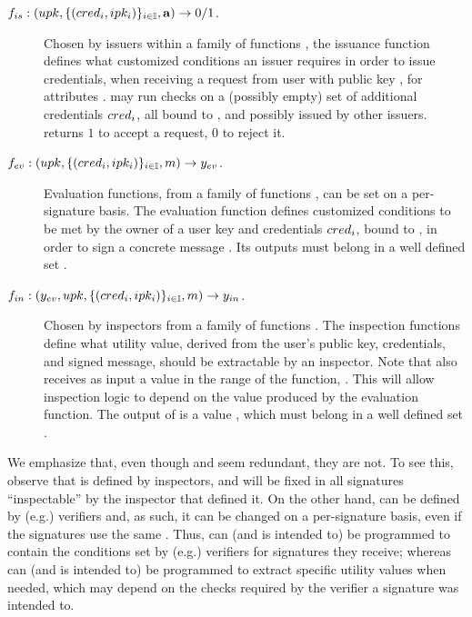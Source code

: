 \begin{description}
\item[$f_{is}: (upk,\lbrace (cred_i,ipk_i) \rbrace_{i \in \mathbb{I}},\mathbf{a})
  \rightarrow 0/1$.] Chosen by issuers within a family of functions \famfissue,
  the issuance function defines what customized conditions an issuer requires
  in order to issue credentials, when receiving a request from user with public
  key \upk, for attributes \attrs. \fissue may run checks on a (possibly empty)
  set of additional credentials $cred_i$, all bound to \upk, and possibly
  issued by other issuers. \fissue returns $1$ to accept a request, $0$ to
  reject it.
\item[$f_{ev}: (upk,\lbrace (cred_i,ipk_i) \rbrace_{i \in \mathbb{I}},m)
  \rightarrow y_{ev}$.] Evaluation functions, from a family of functions
  \famfeval, can be set on a per-signature basis. The evaluation function
  defines customized conditions to be met by the owner of a user key \upk and
  credentials $cred_i$, bound to \upk, in order to sign a concrete message
  \msg. Its outputs \yeval must belong in a well defined set \rngfeval.
\item[$f_{in}: (y_{ev},upk,\lbrace (cred_i,ipk_i) \rbrace_{i \in \mathbb{I}},
  m) \rightarrow y_{in}$.]
  Chosen by inspectors from a family of functions \famfinsp. The inspection
  functions define what utility value, derived from the user's public key,
  credentials, and signed message, should be extractable by an inspector.
  Note that \finsp also receives as input a value in the range of the \feval
  function, \rngfeval. This will allow inspection logic to depend on the value
  produced by the evaluation function. The output of \finsp is a value
  \yinsp, which must belong in a well defined set \rngfinsp.
\end{description}

We emphasize that, even though \finsp and \feval seem redundant, they are not.
To see this, observe that \finsp is defined by inspectors, and will be fixed in
all signatures ``inspectable'' by the inspector that defined it. On the other
hand, \feval can be defined by (e.g.) verifiers and, as such, it can be changed
on a per-signature basis, even if the signatures use the same \finsp. Thus,
\feval can (and is intended to) be programmed to contain the conditions set by
(e.g.) verifiers for signatures they receive; whereas \finsp can (and is intended
to) be programmed to extract specific utility values when needed, which may
depend on the checks required by the verifier a signature was intended to.


